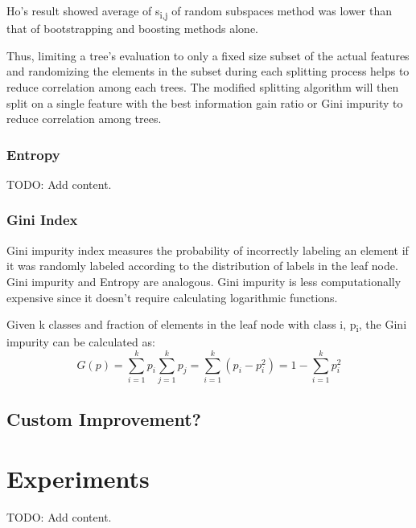 \documentclass{article} %
\begin{document}
Ho's result showed average of s\textsubscript{i,j} of random subspaces method was lower than that of bootstrapping and boosting methods alone. \cite{Ho98}

 Thus, limiting a tree's evaluation to only a fixed size subset of the actual features and randomizing the elements in the subset during each splitting process helps to reduce correlation among each trees. The modified splitting algorithm will then split on a single feature with the best information gain ratio or Gini impurity to reduce correlation among trees.

\subsubsection{Entropy}
TODO: Add content.

\subsubsection{Gini Index}
Gini impurity index measures the probability of incorrectly labeling an element if it was randomly labeled according to the distribution of labels in the leaf node. Gini impurity and Entropy are analogous. Gini impurity is less computationally expensive since it doesn't require calculating logarithmic functions.

Given k classes and fraction of elements in the leaf node with class i, p\textsubscript{i}, the Gini impurity can be calculated as:
\[G(p) = \sum_{i=1}^{k}p_i \sum_{j=1}^{k}p_j = \sum_{i=1}^{k}(p_i-p_i^2) = 1 - \sum_{i=1}^{k}p_i^2 \]

\subsection{Custom Improvement?}

\section{Experiments}
TODO: Add content.
\end{document}
